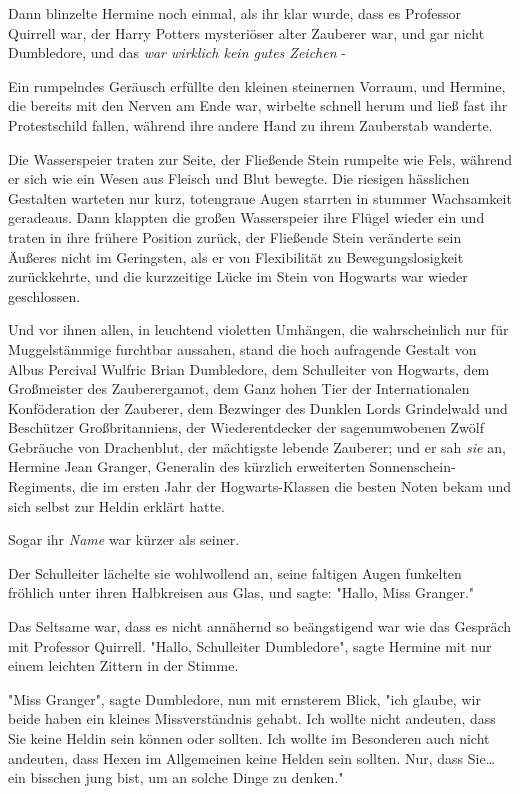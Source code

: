 {Dann blinzelte Hermine noch einmal, als ihr klar wurde, dass es Professor Quirrell war, der Harry Potters mysteriöser alter Zauberer war, und gar nicht Dumbledore, und das \emph{war wirklich kein gutes Zeichen} -

Ein rumpelndes Geräusch erfüllte den kleinen steinernen Vorraum, und Hermine, die bereits mit den Nerven am Ende war, wirbelte schnell herum und ließ fast ihr Protestschild fallen, während ihre andere Hand zu ihrem Zauberstab wanderte.

Die Wasserspeier traten zur Seite, der Fließende Stein rumpelte wie Fels, während er sich wie ein Wesen aus Fleisch und Blut bewegte. Die riesigen hässlichen Gestalten warteten nur kurz, totengraue Augen starrten in stummer Wachsamkeit geradeaus. Dann klappten die großen Wasserspeier ihre Flügel wieder ein und traten in ihre frühere Position zurück, der Fließende Stein veränderte sein Äußeres nicht im Geringsten, als er von Flexibilität zu Bewegungslosigkeit zurückkehrte, und die kurzzeitige Lücke im Stein von Hogwarts war wieder geschlossen.

Und vor ihnen allen, in leuchtend violetten Umhängen, die wahrscheinlich nur für Muggelstämmige furchtbar aussahen, stand die hoch aufragende Gestalt von Albus Percival Wulfric Brian Dumbledore, dem Schulleiter von Hogwarts, dem Großmeister des Zauberergamot, dem Ganz hohen Tier der Internationalen Konföderation der Zauberer, dem Bezwinger des Dunklen Lords Grindelwald und Beschützer Großbritanniens, der Wiederentdecker der sagenumwobenen Zwölf Gebräuche von Drachenblut, der mächtigste lebende Zauberer; und er sah \emph{sie} an, Hermine Jean Granger, Generalin des kürzlich erweiterten Sonnenschein-Regiments, die im ersten Jahr der Hogwarts-Klassen die besten Noten bekam und sich selbst zur Heldin erklärt hatte.

Sogar ihr \emph{Name} war kürzer als seiner.

Der Schulleiter lächelte sie wohlwollend an, seine faltigen Augen funkelten fröhlich unter ihren Halbkreisen aus Glas, und sagte: "Hallo, Miss Granger."

Das Seltsame war, dass es nicht annähernd so beängstigend war wie das Gespräch mit Professor Quirrell. "Hallo, Schulleiter Dumbledore", sagte Hermine mit nur einem leichten Zittern in der Stimme.

"Miss Granger", sagte Dumbledore, nun mit ernsterem Blick, "ich glaube, wir beide haben ein kleines Missverständnis gehabt. Ich wollte nicht andeuten, dass Sie keine Heldin sein können oder sollten. Ich wollte im Besonderen auch nicht andeuten, dass Hexen im Allgemeinen keine Helden sein sollten. Nur, dass Sie… ein bisschen jung bist, um an solche Dinge zu denken."

}
